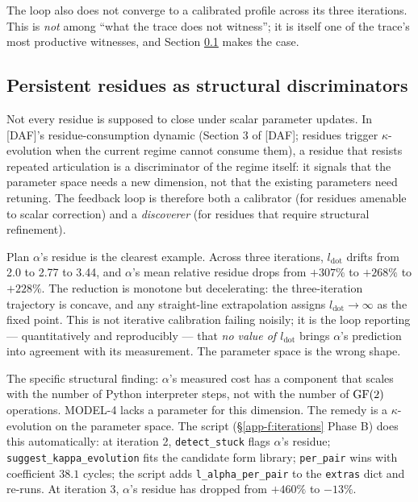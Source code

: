 The loop also does not converge to a calibrated profile
across its three iterations. This is \emph{not} among
``what the trace does not witness''; it is itself one of
the trace's most productive witnesses, and
Section \ref{app-f:persistent-residue} makes the case.

\subsection{Persistent residues as structural discriminators}
\label{app-f:persistent-residue}

Not every residue is supposed to close under scalar
parameter updates. In [DAF]'s residue-consumption dynamic
(Section 3 of [DAF]; residues trigger $\kappa$-evolution
when the current regime cannot consume them), a residue
that resists repeated articulation is a discriminator of
the regime itself: it signals that the parameter space
needs a new dimension, not that the existing parameters
need retuning. The feedback loop is therefore both a
calibrator (for residues amenable to scalar correction)
and a \emph{discoverer} (for residues that require
structural refinement).

Plan $\alpha$'s residue is the clearest example. Across
three iterations, $l_{\mathrm{dot}}$ drifts from 2.0 to
2.77 to 3.44, and $\alpha$'s mean relative residue drops
from $+307\%$ to $+268\%$ to $+228\%$. The reduction is
monotone but decelerating: the three-iteration trajectory
is concave, and any straight-line extrapolation assigns
$l_{\mathrm{dot}} \to \infty$ as the fixed point. This is
not iterative calibration failing noisily; it is the loop
reporting --- quantitatively and reproducibly --- that
\emph{no value of $l_{\mathrm{dot}}$} brings $\alpha$'s
prediction into agreement with its measurement. The
parameter space is the wrong shape.

The specific structural finding: $\alpha$'s measured cost
has a component that scales with the number of Python
interpreter steps, not with the number of $\operatorname{GF}(2)$
operations. MODEL-4 lacks a parameter for this dimension.
The remedy is a $\kappa$-evolution on the parameter space.
The script (\S\ref{app-f:iterations} Phase B) does this
automatically: at iteration 2, \verb|detect_stuck| flags
$\alpha$'s residue; \verb|suggest_kappa_evolution| fits
the candidate form library; \verb|per_pair| wins with
coefficient $38.1$ cycles; the script adds
\verb|l_alpha_per_pair| to the \texttt{extras} dict and
re-runs. At iteration 3, $\alpha$'s residue has dropped
from $+460\%$ to $-13\%$.

